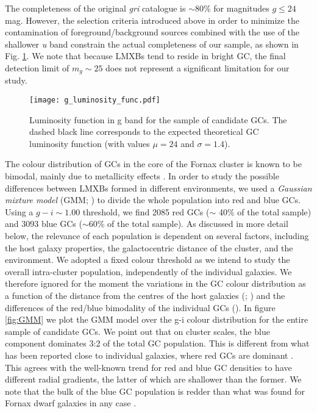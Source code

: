 \documentclass{aa}
\begin{document}
The completeness of the original \textit{gri} catalogue is $\sim 80\%$ for magnitudes $g\leq24$ mag. However, the selection criteria introduced above in order to minimize the contamination of foreground/background sources combined with the use of the shallower \textit{u} band constrain the actual completeness of our sample, as shown in Fig. \ref{fig:g_lfunc}. We note that because LMXBs tend to reside in bright GC, the final detection limit of $m_g\sim 25$ does not represent a significant limitation for our study.



\begin{figure}
    \centering
    \texttt{[image: g\_luminosity\_func.pdf]}
    \caption{ Luminosity function in g band for the sample of candidate GCs. The dashed black line corresponds to the expected theoretical GC luminosity function (with values $\mu=24$ and  $\sigma=1.4$).}
    \label{fig:g_lfunc}
\end{figure}

The colour distribution of GCs in the core of the Fornax cluster is known to be bimodal, mainly due to metallicity effects \citep[see e.g.][and references therein]{D'Abrusco2016,Cantiello2018}. In order to study the possible differences between LMXBs formed in different environments,  we used a \textit{Gaussian mixture model} (GMM; \citealt{Muratov2010}) to divide the whole population into red and blue GCs. Using a $g-i\sim1.00$ threshold, we find 2085 red GCs ($\sim$ 40\% of the total sample) and 3093 blue GCs ($\sim $60\% of the total sample). As discussed in more detail below, the relevance of each population is dependent on several factors, including the host galaxy properties, the galactocentric distance of the cluster, and the environment. We adopted a fixed colour threshold as we intend to study the overall intra-cluster population, independently of the individual galaxies. We therefore ignored for the moment the variations in the GC colour distribution as a function of the distance from the centres of the host galaxies (\citealt{Kim2013}; \citealt{Cantiello2015}) and the differences of the red/blue bimodality of the individual GCs (\citealt{Jordan2015}). In figure \ref{fig:GMM} we plot the GMM model over the g-i colour distribution for the entire sample of candidate GCs.  We point out that on cluster scales, the blue component dominates 3:2 of the total GC population. This is different from what has been reported close to individual galaxies, where red GCs are dominant \citep[e.g.][]{Puzia2014}. This agrees with the well-known trend for red and blue GC densities to have different radial gradients, the latter of which are shallower than the former. We note that the bulk of the blue GC population is redder than what was found for Fornax dwarf galaxies in any case \citep{Prole2019}.
\end{document}
